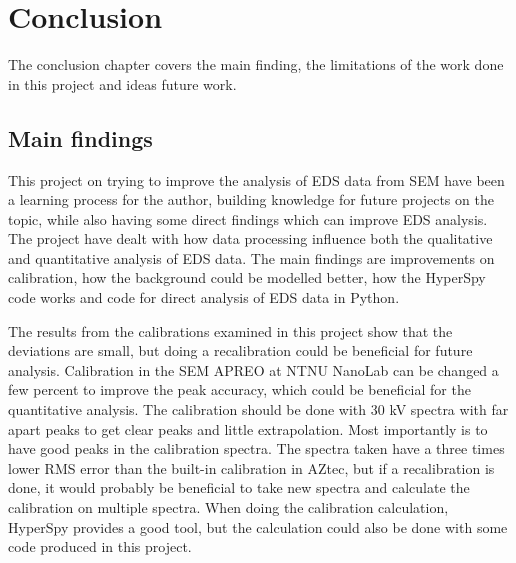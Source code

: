
\chapter{Conclusion}
\label{chap:conclusion}


The conclusion chapter covers the main finding, the limitations of the work done in this project and ideas future work.







\section{Main findings}
\label{sec:mainfindings}


This project on trying to improve the analysis of EDS data from SEM have been a learning process for the author, building knowledge for future projects on the topic, while also having some direct findings which can improve EDS analysis.
The project have dealt with how data processing influence both the qualitative and quantitative analysis of EDS data.
The main findings are improvements on calibration, how the background could be modelled better, how the HyperSpy code works and code for direct analysis of EDS data in Python.


The results from the calibrations examined in this project show that the deviations are small, but doing a recalibration could be beneficial for future analysis.
Calibration in the SEM APREO at NTNU NanoLab can be changed a few percent to improve the peak accuracy, which could be beneficial for the quantitative analysis.
The calibration should be done with 30 kV spectra with far apart peaks to get clear peaks and little extrapolation.
Most importantly is to have good peaks in the calibration spectra.
The spectra taken have a three times lower RMS error than the built-in calibration in AZtec, but if a recalibration is done, it would probably be beneficial to take new spectra and calculate the calibration on multiple spectra.
When doing the calibration calculation, HyperSpy provides a good tool, but the calculation could also be done with some code produced in this project.


